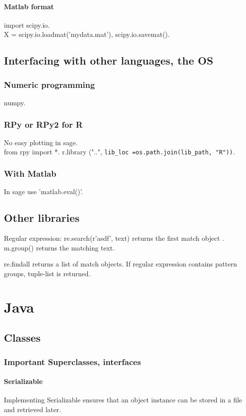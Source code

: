 \documentclass[oneside, article]{memoir}
\begin{document}
\subsubsection{Matlab format}
import scipy.io. \\
X = scipy.io.loadmat('mydata.mat'), scipy.io.savemat().

\section{Interfacing with other languages, the OS}
\subsection{Numeric programming}
numpy.

\subsection{RPy or RPy2 for R}
No easy plotting in sage.\\
 from rpy import *. r.library ("..",  \verb'lib_loc =os.path.join(lib_path, "R"))'.

\subsection{With Matlab}
In sage use 'matlab.eval()'.

\section{Other libraries}
Regular expression: re.search(r'asdf', text) returns the first match object . m.group() returns the matching text.

re.findall returns a list of match objects. If regular expression contains pattern groups, tuple-list is returned.

\chapter{Java}
\section{Classes}
\subsection{Important Superclasses, interfaces}
\subsubsection{Serializable}
Implementing Serializable ensures that an object instance can be stored in a file and retrieved later.
\end{document}

